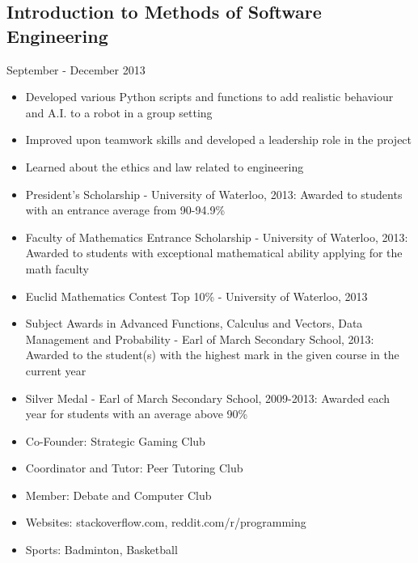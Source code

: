 \documentclass[11pt]{article}
\begin{document}
\begin{minipage}[t]{0.8\linewidth}
	\subsection*{Introduction to Methods of Software Engineering}\vspace{-6pt} 
		\noindent \hfill September - December 2013
		\begin{itemize}
			\item Developed various Python scripts and functions to add realistic behaviour and A.I. to a	 								robot in a group setting
			\item Improved upon teamwork skills and developed a leadership role in the project 				
			\item Learned about the ethics and law related to engineering 
		\end{itemize} \vspace{24pt}    
	
	\begin{itemize}
		\item President's Scholarship - University of Waterloo, 2013: Awarded to students with an entrance average 				from 90-94.9\%
		\item Faculty of Mathematics Entrance Scholarship - University of Waterloo, 2013: Awarded to students with 				exceptional mathematical ability applying for the math faculty
		\item Euclid Mathematics Contest Top 10\% - University of Waterloo, 2013	
		\item Subject Awards in Advanced Functions, Calculus and Vectors, Data Management and Probability - Earl 						of March Secondary School, 2013: Awarded to the student(s) with the highest mark in the given 						course in the current year
		\item Silver Medal - Earl of March Secondary School, 2009-2013: Awarded each year for students with an 						average above 90\%
	\end{itemize} \vspace{24pt}
	
	\begin{itemize}
		\item Co-Founder: Strategic Gaming Club
		\item Coordinator and Tutor: Peer Tutoring Club
		\item Member: Debate and Computer Club
		\item Websites: stackoverflow.com, reddit.com/r/programming
		\item Sports: Badminton, Basketball 
	\end{itemize} 
\end{minipage}
	
\end{document}
